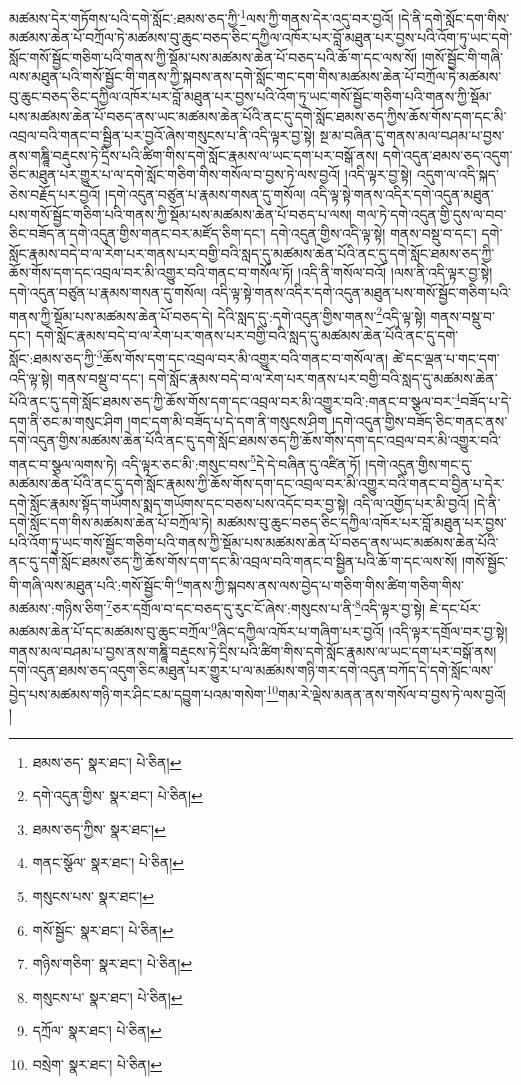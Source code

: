 མཚམས་དེར་གཏོགས་པའི་དགེ་སློང་:ཐམས་ཅད་ཀྱི་\footnote{ཐམས་ཅད་  སྣར་ཐང་།  པེ་ཅིན། }ལས་ཀྱི་གནས་དེར་འདུ་བར་བྱའོ། །དེ་ནི་དགེ་སློང་དག་གིས་མཚམས་ཆེན་པོ་བཀྲོལ་ཏེ་མཚམས་བུ་ཆུང་བཅད་ཅིང་དཀྱིལ་འཁོར་པར་བློ་མཐུན་པར་བྱས་པའི་འོག་ཏུ་ཡང་དགེ་སློང་གསོ་སྦྱོང་གཅིག་པའི་གནས་ཀྱི་སྡོམ་པས་མཚམས་ཆེན་པོ་བཅད་པའི་ཆོ་ག་དང་ལས་སོ། །གསོ་སྦྱོང་གི་གཞི་ལས་མཐུན་པའི་གསོ་སྦྱོང་གི་གནས་ཀྱི་སྐབས་ནས་དགེ་སློང་གང་དག་གིས་མཚམས་ཆེན་པོ་བཀྲོལ་ཏེ་མཚམས་བུ་ཆུང་བཅད་ཅིང་དཀྱིལ་འཁོར་པར་བློ་མཐུན་པར་བྱས་པའི་འོག་ཏུ་ཡང་གསོ་སྦྱོང་གཅིག་པའི་གནས་ཀྱི་སྡོམ་པས་མཚམས་ཆེན་པོ་བཅད་ནས་ཡང་མཚམས་ཆེན་པོའི་ནང་དུ་དགེ་སློང་ཐམས་ཅད་ཀྱིས་ཆོས་གོས་དག་དང་མི་འབྲལ་བའི་གནང་བ་སྦྱིན་པར་བྱའོ་ཞེས་གསུངས་པ་ནི་འདི་ལྟར་བྱ་སྟེ། སྔ་མ་བཞིན་དུ་གནས་མལ་བཤམ་པ་བྱས་ནས་གཎྜཱི་བརྡུངས་ཏེ་དྲིས་པའི་ཚིག་གིས་དགེ་སློང་རྣམས་ལ་ཡང་དག་པར་བསྒོ་ནས། དགེ་འདུན་ཐམས་ཅད་འདུག་ཅིང་མཐུན་པར་གྱུར་པ་ལ་དགེ་སློང་གཅིག་གིས་གསོལ་བ་བྱས་ཏེ་ལས་བྱའོ། །འདི་ལྟར་བྱ་སྟེ། འདུག་ལ་འདི་སྐད་ཅེས་བརྗོད་པར་བྱའོ། །དགེ་འདུན་བཙུན་པ་རྣམས་གསན་དུ་གསོལ། འདི་ལྟ་སྟེ་གནས་འདིར་དགེ་འདུན་མཐུན་པས་གསོ་སྦྱོང་གཅིག་པའི་གནས་ཀྱི་སྡོམ་པས་མཚམས་ཆེན་པོ་བཅད་པ་ལས། གལ་ཏེ་དགེ་འདུན་གྱི་དུས་ལ་བབ་ཅིང་བཟོད་ན་དགེ་འདུན་གྱིས་གནང་བར་མཛོད་ཅིག་དང་། དགེ་འདུན་གྱིས་འདི་ལྟ་སྟེ། གནས་བསྡུ་བ་དང་། དགེ་སློང་རྣམས་བདེ་བ་ལ་རེག་པར་གནས་པར་བགྱི་བའི་སླད་དུ་མཚམས་ཆེན་པོའི་ནང་དུ་དགེ་སློང་ཐམས་ཅད་ཀྱི་ཆོས་གོས་དག་དང་འབྲལ་བར་མི་འགྱུར་བའི་གནང་བ་གསོལ་ཏོ། །འདི་ནི་གསོལ་བའོ། །ལས་ནི་འདི་ལྟར་བྱ་སྟེ། དགེ་འདུན་བཙུན་པ་རྣམས་གསན་དུ་གསོལ། འདི་ལྟ་སྟེ་གནས་འདིར་དགེ་འདུན་མཐུན་པས་གསོ་སྦྱོང་གཅིག་པའི་གནས་ཀྱི་སྡོམ་པས་མཚམས་ཆེན་པོ་བཅད་དེ། དེའི་སླད་དུ་:དགེ་འདུན་གྱིས་གནས་\footnote{དགེ་འདུན་གྱིས་  སྣར་ཐང་།  པེ་ཅིན། }འདི་ལྟ་སྟེ། གནས་བསྡུ་བ་དང་། དགེ་སློང་རྣམས་བདེ་བ་ལ་རེག་པར་གནས་པར་བགྱི་བའི་སླད་དུ་མཚམས་ཆེན་པོའི་ནང་དུ་དགེ་སློང་:ཐམས་ཅད་ཀྱི་\footnote{ཐམས་ཅད་ཀྱིས་  སྣར་ཐང་། }ཆོས་གོས་དག་དང་འབྲལ་བར་མི་འགྱུར་བའི་གནང་བ་གསོལ་ན། ཚེ་དང་ལྡན་པ་གང་དག་འདི་ལྟ་སྟེ། གནས་བསྡུ་བ་དང་། དགེ་སློང་རྣམས་བདེ་བ་ལ་རེག་པར་གནས་པར་བགྱི་བའི་སླད་དུ་མཚམས་ཆེན་པོའི་ནང་དུ་དགེ་སློང་ཐམས་ཅད་ཀྱི་ཆོས་གོས་དག་དང་འབྲལ་བར་མི་འགྱུར་བའི་:གནང་བ་སྩལ་བར་\footnote{གནང་སྩོལ་  སྣར་ཐང་།  པེ་ཅིན། }བཟོད་པ་དེ་དག་ནི་ཅང་མ་གསུང་ཤིག །གང་དག་མི་བཟོད་པ་དེ་དག་ནི་གསུངས་ཤིག །དགེ་འདུན་གྱིས་བཟོད་ཅིང་གནང་ནས་དགེ་འདུན་གྱིས་མཚམས་ཆེན་པོའི་ནང་དུ་དགེ་སློང་ཐམས་ཅད་ཀྱི་ཆོས་གོས་དག་དང་འབྲལ་བར་མི་འགྱུར་བའི་གནང་བ་སྩལ་ལགས་ཏེ། འདི་ལྟར་ཅང་མི་:གསུང་བས་\footnote{གསུངས་པས་  སྣར་ཐང་། }དེ་དེ་བཞིན་དུ་འཛིན་ཏོ། །དགེ་འདུན་གྱིས་གང་དུ་མཚམས་ཆེན་པོའི་ནང་དུ་དགེ་སློང་རྣམས་ཀྱི་ཆོས་གོས་དག་དང་འབྲལ་བར་མི་འགྱུར་བའི་གནང་བ་བྱིན་པ་དེར་དགེ་སློང་རྣམས་སྟོད་གཡོགས་སྨད་གཡོགས་དང་བཅས་པས་འདོང་བར་བྱ་སྟེ། འདི་ལ་འགྱོད་པར་མི་བྱའོ། །དེ་ནི་དགེ་སློང་དག་གིས་མཚམས་ཆེན་པོ་བཀྲོལ་ཏེ། མཚམས་བུ་ཆུང་བཅད་ཅིང་དཀྱིལ་འཁོར་པར་བློ་མཐུན་པར་བྱས་པའི་འོག་ཏུ་ཡང་གསོ་སྦྱོང་གཅིག་པའི་གནས་ཀྱི་སྡོམ་པས་མཚམས་ཆེན་པོ་བཅད་ནས་ཡང་མཚམས་ཆེན་པོའི་ནང་དུ་དགེ་སློང་ཐམས་ཅད་ཀྱི་ཆོས་གོས་དག་དང་མི་འབྲལ་བའི་གནང་བ་སྦྱིན་པའི་ཆོ་ག་དང་ལས་སོ། །གསོ་སྦྱོང་གི་གཞི་ལས་མཐུན་པའི་:གསོ་སྦྱོང་གི་\footnote{གསོ་སྦྱོང་  སྣར་ཐང་།  པེ་ཅིན། }གནས་ཀྱི་སྐབས་ནས་ལས་བྱེད་པ་གཅིག་གིས་ཚིག་གཅིག་གིས་མཚམས་:གཉིས་ཅིག་\footnote{གཉིས་གཅིག་  སྣར་ཐང་།  པེ་ཅིན། }ཅར་དགྲོལ་བ་དང་བཅད་དུ་རུང་ངོ་ཞེས་:གསུངས་པ་ནི་\footnote{གསུངས་པ་  སྣར་ཐང་།  པེ་ཅིན། }འདི་ལྟར་བྱ་སྟེ། ཇེ་དང་པོར་མཚམས་ཆེན་པོ་དང་མཚམས་བུ་ཆུང་བཀྲོལ་\footnote{དཀྲོལ་  སྣར་ཐང་།  པེ་ཅིན། }ཞིང་དཀྱིལ་འཁོར་པ་གཞིག་པར་བྱའོ། །འདི་ལྟར་དགྲོལ་བར་བྱ་སྟེ། གནས་མལ་བཤམ་པ་བྱས་ནས་གཎྜཱི་བརྡུངས་ཏེ་དྲིས་པའི་ཚིག་གིས་དགེ་སློང་རྣམས་ལ་ཡང་དག་པར་བསྒོ་ནས། དགེ་འདུན་ཐམས་ཅད་འདུག་ཅིང་མཐུན་པར་གྱུར་པ་ལ་མཚམས་གཉི་གར་དགེ་འདུན་བཀོད་དེ་དགེ་སློང་ལས་བྱེད་པས་མཚམས་གཉི་གར་ཤིང་ངམ་དབྱུག་པའམ་གསེག་\footnote{བསྲེག་  སྣར་ཐང་།  པེ་ཅིན། }གམ་རེ་ལྡེས་མནན་ནས་གསོལ་བ་བྱས་ཏེ་ལས་བྱའོ། །
